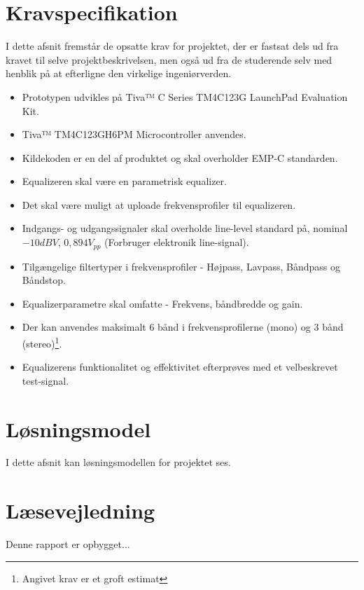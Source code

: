 
\section{Kravspecifikation} \label{afs:kravspecifikation}
I dette afsnit fremstår de opsatte krav for projektet, der er fastsat dels ud fra kravet til selve projektbeskrivelsen, men også ud fra de studerende selv med henblik på at efterligne den virkelige ingeniørverden.

\begin{itemize}
	\item Prototypen udvikles på Tiva™ C Series TM4C123G LaunchPad Evaluation Kit.
	\item Tiva™ TM4C123GH6PM Microcontroller anvendes.
	\item Kildekoden er en del af produktet og skal overholder EMP-C standarden.
	\item Equalizeren skal være en parametrisk equalizer.
	\item Det skal være muligt at uploade frekvensprofiler til equalizeren.
	\item Indgangs- og udgangssignaler skal overholde line-level standard på, nominal $-10 dBV$, $0,894 V_{pp}$ (Forbruger elektronik line-signal).
	\item Tilgængelige filtertyper i frekvensprofiler - Højpass, Lavpass, Båndpass og Båndstop.
	\item Equalizerparametre skal omfatte - Frekvens, båndbredde og gain.
	\item Der kan anvendes maksimalt 6 bånd i frekvensprofilerne (mono) og 3 bånd (stereo)\footnote{Angivet krav er et groft estimat}.   
	\item Equalizerens funktionalitet og effektivitet efterprøves med et velbeskrevet test-signal.
\end{itemize}

\section{Løsningsmodel}
I dette afsnit kan løsningsmodellen for projektet ses.

\section{Læsevejledning}
Denne rapport er opbygget...

